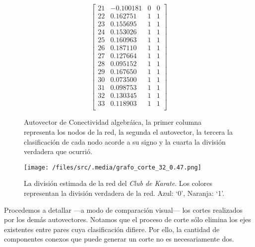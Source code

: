 \begin{figure}[!htbp]
\begin{equation*}
\begin{bmatrix}
        21  &-0.100181 & 0 & 0 \\
        22  &0.162751 & 1 & 1 \\
        23  &0.155695 & 1 & 1 \\
        24  &0.153026 & 1 & 1 \\
        25  &0.160963 & 1 & 1 \\
        26  &0.187110 & 1 & 1 \\
        27  &0.127664 & 1 & 1 \\
        28  &0.095152 & 1 & 1 \\
        29  &0.167650 & 1 & 1 \\
        30  &0.073500 & 1 & 1 \\
        31  &0.098753 & 1 & 1 \\
        32  &0.130345 & 1 & 1 \\
        33  &0.118903 & 1 & 1 \\
    \end{bmatrix}
\end{equation*}
\caption{Autovector de Conectividad algebráica, la primer columna representa los nodos de la red, la segunda el autovector, la tercera la clasificación de cada nodo acorde a su signo y la cuarta la división verdadera que ocurrió.} \label{prediccion_karate}
\end{figure}

\vspace{1em}
\begin{figure}[!htbp]
\texttt{[image: /files/src/.media/grafo\_corte\_32\_0.47.png]}
\caption{La división estimada de la red del \textit{Club de Karate}. Los colores representan la división verdadera de la red. Azul: `0', Naranja: `1'.}
\end{figure}

\vspace{1em}
Procedemos a detallar ---a modo de comparación visual--- los cortes realizados por los demás autovectores. Notamos que el proceso de corte sólo elimina los ejes existentes entre pares cuya clasificación difiere. Por ello, la cantidad de componentes conexos que puede generar un corte no es necesariamente dos.  

